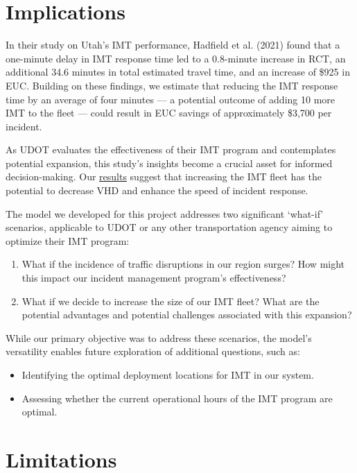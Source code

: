 \documentclass[fancy, oneside, mastersfancy, ms]{byuthesis}
\providecommand{\tightlist}{%
  \setlength{\itemsep}{0pt}\setlength{\parskip}{0pt}}\usepackage{longtable,booktabs,array}
\begin{document}
\hypertarget{sec-implications}{%
\section{Implications}\label{sec-implications}}

In their study on Utah's IMT performance, Hadfield et al. (2021) found
that a one-minute delay in IMT response time led to a 0.8-minute
increase in RCT, an additional 34.6 minutes in total estimated travel
time, and an increase of \$925 in EUC. Building on these findings, we
estimate that reducing the IMT response time by an average of four
minutes --- a potential outcome of adding 10 more IMT to the fleet ---
could result in EUC savings of approximately \$3,700 per incident.

As UDOT evaluates the effectiveness of their IMT program and
contemplates potential expansion, this study's insights become a crucial
asset for informed decision-making. Our
\protect\hyperlink{sec-results}{results} suggest that increasing the IMT
fleet has the potential to decrease VHD and enhance the speed of
incident response.

The model we developed for this project addresses two significant
`what-if' scenarios, applicable to UDOT or any other transportation
agency aiming to optimize their IMT program:

\begin{enumerate}
\def\labelenumi{\arabic{enumi}.}
\tightlist
\item
  What if the incidence of traffic disruptions in our region surges? How
  might this impact our incident management program's effectiveness?
\item
  What if we decide to increase the size of our IMT fleet? What are the
  potential advantages and potential challenges associated with this
  expansion?
\end{enumerate}

While our primary objective was to address these scenarios, the model's
versatility enables future exploration of additional questions, such as:

\begin{itemize}
\tightlist
\item
  Identifying the optimal deployment locations for IMT in our system.
\item
  Assessing whether the current operational hours of the IMT program are
  optimal.
\end{itemize}

\hypertarget{sec-limitations}{%
\section{Limitations}\label{sec-limitations}}
\end{document}

